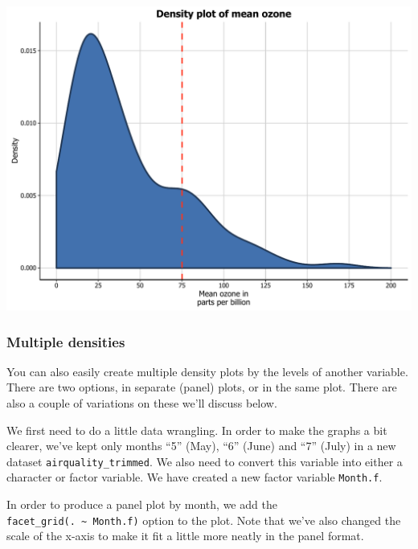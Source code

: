 \documentclass[]{article}
\begin{document}
\begin{center}\includegraphics{0_all_posts_pdf/density_13-1} \end{center}

\subsubsection{Multiple densities}\label{multiple-densities}

You can also easily create multiple density plots by the levels of
another variable. There are two options, in separate (panel) plots, or
in the same plot. There are also a couple of variations on these we'll
discuss below.

We first need to do a little data wrangling. In order to make the graphs
a bit clearer, we've kept only months ``5'' (May), ``6'' (June) and
``7'' (July) in a new dataset \texttt{airquality\_trimmed}. We also need
to convert this variable into either a character or factor variable. We
have created a new factor variable \texttt{Month.f}.

In order to produce a panel plot by month, we add the
\texttt{facet\_grid(.\ \textasciitilde{}\ Month.f)} option to the plot.
Note that we've also changed the scale of the x-axis to make it fit a
little more neatly in the panel format.
\end{document}
